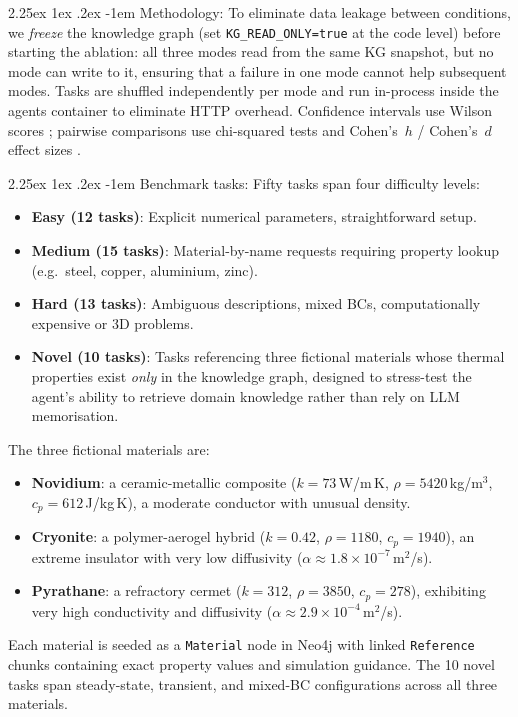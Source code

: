 \documentclass[preprint,review,12pt]{elsarticle}
\makeatletter
\renewcommand\paragraph{\@startsection{paragraph}{4}{\z@}%
  {2.25ex \@plus1ex \@minus.2ex}%
  {-1em}%
  {\normalfont\normalsize\bfseries}}
\makeatother
\begin{document}
\paragraph{Methodology:}
To eliminate data leakage between conditions, we \emph{freeze} the
knowledge graph (set \texttt{KG\_READ\_ONLY=true} at the code level)
before starting the ablation: all three modes read from the same KG
snapshot, but no mode can write to it, ensuring that a failure in one
mode cannot help subsequent modes.
Tasks are shuffled independently per mode and run in-process inside the
agents container to eliminate HTTP overhead.
Confidence intervals use Wilson scores \citep{wilson1927}; pairwise
comparisons use chi-squared tests and Cohen's~$h$ / Cohen's~$d$ effect
sizes \citep{cohen1988}.

\paragraph{Benchmark tasks:}
Fifty tasks span four difficulty levels:
\begin{itemize}
  \item \textbf{Easy (12 tasks)}: Explicit numerical parameters, straightforward setup.
  \item \textbf{Medium (15 tasks)}: Material-by-name requests requiring
        property lookup (e.g.\ steel, copper, aluminium, zinc).
  \item \textbf{Hard (13 tasks)}: Ambiguous descriptions, mixed BCs,
        computationally expensive or 3D problems.
  \item \textbf{Novel (10 tasks)}: Tasks referencing three fictional
        materials whose thermal properties exist \emph{only} in the
        knowledge graph, designed to stress-test the agent's ability
        to retrieve domain knowledge rather than rely on LLM memorisation.
\end{itemize}

The three fictional materials are:
\begin{itemize}
  \item \textbf{Novidium}: a ceramic-metallic composite ($k{=}73$\,W/m\,K,
        $\rho{=}5420$\,kg/m$^3$, $c_p{=}612$\,J/kg\,K),
        a moderate conductor with unusual density.
  \item \textbf{Cryonite}: a polymer-aerogel hybrid ($k{=}0.42$,
        $\rho{=}1180$, $c_p{=}1940$), an extreme insulator with
        very low diffusivity ($\alpha \approx 1.8{\times}10^{-7}$\,m$^2$/s).
  \item \textbf{Pyrathane}: a refractory cermet ($k{=}312$,
        $\rho{=}3850$, $c_p{=}278$), exhibiting very high conductivity
        and diffusivity ($\alpha \approx 2.9{\times}10^{-4}$\,m$^2$/s).
\end{itemize}
Each material is seeded as a \texttt{Material} node in Neo4j with linked
\texttt{Reference} chunks containing exact property values and
simulation guidance.  The 10 novel tasks span steady-state, transient,
and mixed-BC configurations across all three materials.
\end{document}
